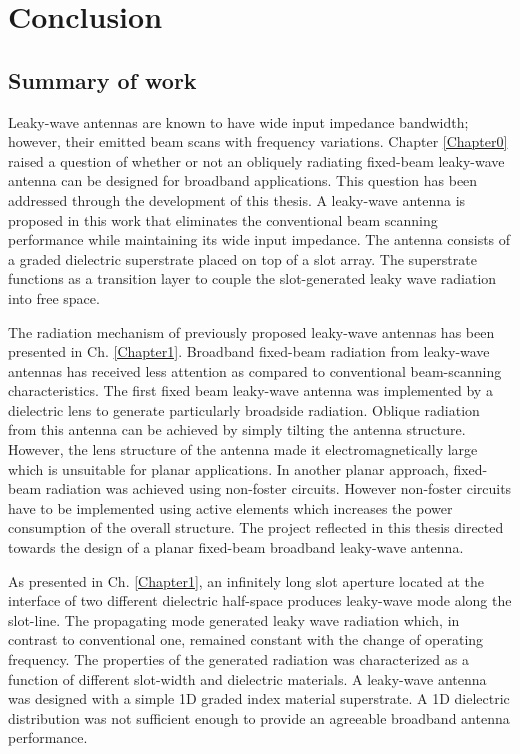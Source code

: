 
\chapter{Conclusion} %
\label{Chapter4}
\renewcommand{\sectionmark}[1]{\markright{\thesection.\ #1}}
\chead{\rightmark}
\section{Summary of work}

Leaky-wave antennas are known to have wide input impedance bandwidth; however, their emitted beam scans with frequency variations. Chapter \ref{Chapter0} raised a question of whether or not an obliquely radiating fixed-beam leaky-wave antenna can be designed for broadband applications. This question has been addressed through the development of this thesis. A leaky-wave antenna is proposed in this work that eliminates the conventional beam scanning performance while maintaining its wide input impedance. The antenna consists of a graded dielectric superstrate placed on top of a slot array. The superstrate functions as a transition layer to couple the slot-generated leaky wave radiation into free space. 

The radiation mechanism of previously proposed leaky-wave antennas has been presented in Ch. \ref{Chapter1}. Broadband fixed-beam radiation from leaky-wave antennas has received less attention as compared to conventional beam-scanning characteristics. The first fixed beam leaky-wave antenna was implemented by a dielectric lens to generate particularly broadside radiation. Oblique radiation from this antenna can be achieved by simply tilting the antenna structure. However,  the lens structure of the antenna made it electromagnetically large which is unsuitable for planar applications. In another planar approach, fixed-beam radiation was achieved using non-foster circuits. However non-foster circuits have to be implemented using active elements which increases the power consumption of the overall structure. The project reflected in this thesis directed towards the design of a planar fixed-beam broadband leaky-wave antenna.

As presented in Ch. \ref{Chapter1}, an infinitely long slot aperture located at the interface of two different dielectric half-space produces leaky-wave mode along the slot-line. The propagating mode generated leaky wave radiation which, in contrast to conventional one, remained constant with the change of operating frequency. The properties of the generated radiation was characterized as a function of different slot-width and dielectric materials. A leaky-wave antenna was designed with a simple 1D graded index material superstrate. A 1D dielectric distribution was not sufficient enough to provide an agreeable broadband antenna performance.

